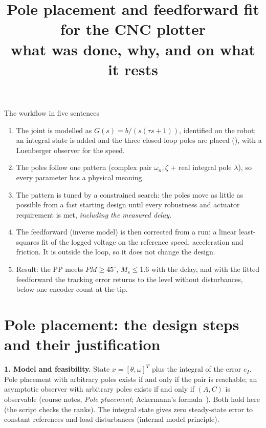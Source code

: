 \documentclass[10pt,a4paper]{article}
\title{\textbf{Pole placement and feedforward fit for the CNC plotter}\\[2pt]\large what was done, why, and on what it rests}
\date{}
\newcommand{\code}[1]{\texttt{\detokenize{#1}}}
\begin{document}
\maketitle
\vspace{-9mm}

\begin{keybox}{The workflow in five sentences}
\begin{enumerate}
  \item The joint is modelled as $G(s)=b/(s(\tau s+1))$, identified on the robot; an integral state is added and the three
        closed-loop poles are placed (\code{design_pp.m}), with a Luenberger observer for the speed.
  \item The poles follow one pattern (complex pair $\omega_n,\zeta$ + real integral pole $\lambda$), so every parameter has a
        physical meaning.
  \item The pattern is tuned by a constrained search: the poles move as little as possible from a fast starting design until
        every robustness and actuator requirement is met, \emph{including the measured delay}.
  \item The feedforward (inverse model) is then corrected from a run: a linear least-squares fit of the logged voltage on the
        reference speed, acceleration and friction. It is outside the loop, so it does not change the design.
  \item Result: the PP meets $PM\geq45^\circ$, $M_s\leq1.6$ with the delay, and with the fitted feedforward the tracking error
        returns to the level without disturbances, below one encoder count at the tip.
\end{enumerate}
\end{keybox}

\section{Pole placement: the design steps and their justification}

\textbf{1. Model and feasibility.} State $x=[\theta,\omega]^T$ plus the integral of the error $e_I$. Pole placement with arbitrary
poles exists if and only if the pair is reachable; an asymptotic observer with arbitrary poles exists if and only if $(A,C)$ is
observable (course notes, \emph{Pole placement}; Ackermann's formula~\cite{ackermann72}). Both hold here
(the script checks the ranks). The integral state gives zero steady-state error to constant references and load
disturbances (internal model principle).
\end{document}
